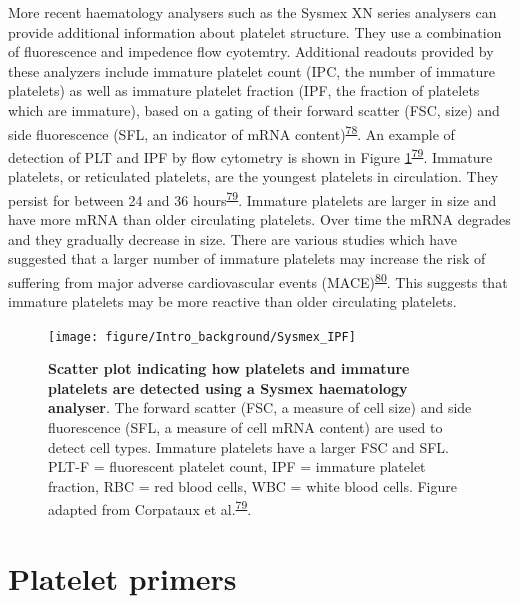 \documentclass[11pt,twoside]{bristolthesis}
\begin{document}
More recent haematology analysers such as the Sysmex XN series analysers can provide additional information about platelet structure. They use a combination of fluorescence and impedence flow cyotemtry. Additional readouts provided by these analyzers include immature platelet count (IPC, the number of immature platelets) as well as immature platelet fraction (IPF, the fraction of platelets which are immature), based on a gating of their forward scatter (FSC, size) and side fluorescence (SFL, an indicator of mRNA content)\textsuperscript{\protect\hyperlink{ref-UnayDemirel2018a}{78}}. An example of detection of PLT and IPF by flow cytometry is shown in Figure \ref{fig:sysmex-ipf}\textsuperscript{\protect\hyperlink{ref-Corpataux2020}{79}}. Immature platelets, or reticulated platelets, are the youngest platelets in circulation. They persist for between 24 and 36 hours\textsuperscript{\protect\hyperlink{ref-Corpataux2020}{79}}. Immature platelets are larger in size and have more mRNA than older circulating platelets. Over time the mRNA degrades and they gradually decrease in size. There are various studies which have suggested that a larger number of immature platelets may increase the risk of suffering from major adverse cardiovascular events (MACE)\textsuperscript{\protect\hyperlink{ref-Ibrahim2014}{80}}. This suggests that immature platelets may be more reactive than older circulating platelets.




\begin{figure}

{\centering \texttt{[image: figure/Intro\_background/Sysmex\_IPF]} 

}

\caption[Scatter plot indicating how platelets are immature platelets are detected using a Sysmex haematology analyser]{\textbf{Scatter plot indicating how platelets and immature platelets are detected using a Sysmex haematology analyser}. The forward scatter (FSC, a measure of cell size) and side fluorescence (SFL, a measure of cell mRNA content) are used to detect cell types. Immature platelets have a larger FSC and SFL. PLT-F = fluorescent platelet count, IPF = immature platelet fraction, RBC = red blood cells, WBC = white blood cells. Figure adapted from Corpataux et al.\textsuperscript{\protect\hyperlink{ref-Corpataux2020}{79}}.}\label{fig:sysmex-ipf}
\end{figure}
\hypertarget{platelet-primers}{%
\section{Platelet primers}\label{platelet-primers}}
\end{document}
